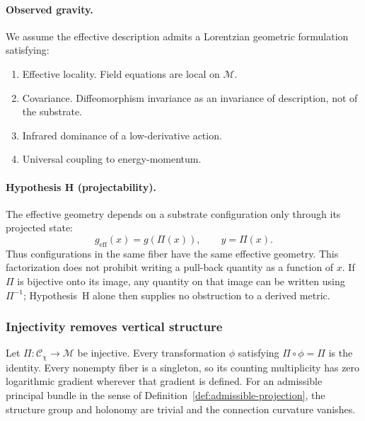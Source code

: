     \paragraph{Observed gravity.}
      We assume the effective description admits a Lorentzian geometric formulation satisfying:
    \begin{enumerate}[label=(D\arabic*)]
  \item \label{D1}
  Effective locality.
  Field equations are local on $\mathcal{M}$.
  \item \label{D2}
  Covariance.
  Diffeomorphism invariance as an invariance of description, not of the substrate.
  \item \label{D3}
  Infrared dominance of a low-derivative action.
  \item \label{D4}
  Universal coupling to energy-momentum.
      \end{enumerate}

    \paragraph{Hypothesis H (projectability).}
      The effective geometry depends on a substrate configuration only through its projected state:
    \begin{equation}
      g_{\mathrm{eff}}(x) = g(\Pi(x)),
      \qquad y=\Pi(x).
      \label{eq:hypothesis-H}
    \end{equation}
      Thus configurations in the same fiber have the same effective geometry.
      This factorization does not prohibit writing a pull-back quantity as a function of $x$.
      If $\Pi$ is bijective onto its image, any quantity on that image can be written using $\Pi^{-1}$;
      Hypothesis~H alone then supplies no obstruction to a derived metric.

  \subsubsection*{Injectivity removes vertical structure}
    \label{subsec:lemma1}

    \begin{lemma}
      \label{lem:injectivity-no-gravity}
      Let $\Pi : \mathcal{C}_\chi \to \mathcal{M}$ be injective.
      Every transformation $\phi$ satisfying $\Pi\circ\phi=\Pi$ is the identity.
      Every nonempty fiber is a singleton, so its counting multiplicity has zero logarithmic gradient
      wherever that gradient is defined.
      For an admissible principal bundle in the sense of Definition~\ref{def:admissible-projection},
      the structure group and holonomy are trivial and the connection curvature vanishes.
    \end{lemma}

